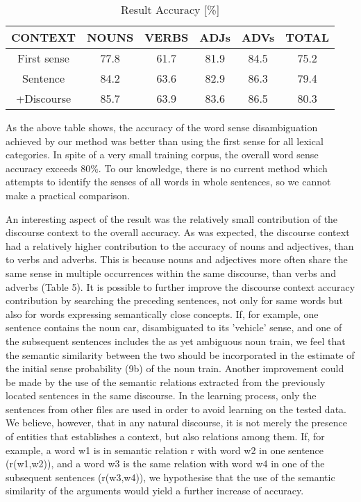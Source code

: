 \begin{table}[t]
  \leavevmode
    \caption{Result Accuracy [\%]}
    \label{tab:6}
  \begin{center}
\begin{tabular}[c]{|c|c|c|c|c|c|}\hline
 CONTEXT & NOUNS & VERBS & ADJs & ADVs & TOTAL \\\hline
 First sense & 77.8 & 61.7 & 81.9 & 84.5 & 75.2 \\\hline
 Sentence & 84.2 & 63.6 & 82.9 & 86.3 & 79.4 \\\hline
 +Discourse & 85.7 & 63.9 & 83.6 & 86.5 & 80.3 \\\hline
\end{tabular}
\end{center}
\end{table}

As the above table shows, the accuracy of the word sense disambiguation achieved by our method was better than using the first sense for all lexical categories. In spite of a very small training corpus, the overall word sense accuracy exceeds 80\%. To our knowledge, there is no current method which attempts to identify the senses of all words in whole sentences, so we cannot make a practical comparison. 

An interesting aspect of the result was the relatively small contribution of the discourse context to the overall accuracy. As was expected, the discourse context had a relatively higher contribution to the accuracy of nouns and adjectives, than to verbs and adverbs. This is because nouns and adjectives more often share the same sense in multiple occurrences within the same discourse, than verbs and adverbs (Table 5). It is possible to further improve the discourse context accuracy contribution by searching the preceding sentences, not only for same words but also for words expressing semantically close concepts. If, for example, one sentence contains the noun car, disambiguated to its 'vehicle' sense, and one of the subsequent sentences includes the as yet ambiguous noun train, we feel that the semantic similarity between the two should be incorporated in the estimate of the initial sense probability (9b) of the noun train. Another improvement could be made by the use of the semantic relations extracted from the previously located sentences in the same discourse. In the learning process, only the sentences from other files are used in order to avoid learning on the tested data. We believe, however, that in any natural discourse, it is not merely the presence of entities that establishes a context, but also relations among them. If, for example, a word w1 is in semantic relation r with word w2 in one sentence (r(w1,w2)), and a word w3 is the same relation with word w4 in one of the subsequent sentences (r(w3,w4)), we hypothesise that the use of the semantic similarity of the arguments would yield a further increase of accuracy.


